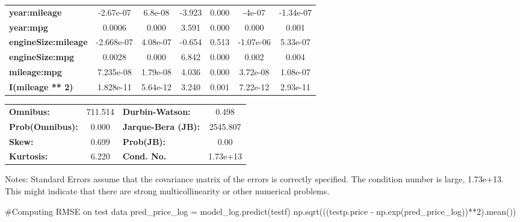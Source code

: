 \documentclass[
  letterpaper,
  DIV=11,
  numbers=noendperiod]{scrreprt}
\newenvironment{Shaded}{\begin{snugshade}}{\end{snugshade}}
\newcommand{\CommentTok}[1]{\textcolor[rgb]{0.37,0.37,0.37}{#1}}
\newcommand{\DecValTok}[1]{\textcolor[rgb]{0.68,0.00,0.00}{#1}}
\newcommand{\NormalTok}[1]{\textcolor[rgb]{0.00,0.23,0.31}{#1}}
\newcommand{\OperatorTok}[1]{\textcolor[rgb]{0.37,0.37,0.37}{#1}}
\begin{document}
\begin{center}
\begin{tabular}{lcccccc}
\textbf{year:mileage}       &    -2.67e-07  &      6.8e-08     &    -3.923  &         0.000        &       -4e-07    &    -1.34e-07     \\
\textbf{year:mpg}           &       0.0006  &        0.000     &     3.591  &         0.000        &        0.000    &        0.001     \\
\textbf{engineSize:mileage} &   -2.668e-07  &     4.08e-07     &    -0.654  &         0.513        &    -1.07e-06    &     5.33e-07     \\
\textbf{engineSize:mpg}     &       0.0028  &        0.000     &     6.842  &         0.000        &        0.002    &        0.004     \\
\textbf{mileage:mpg}        &    7.235e-08  &     1.79e-08     &     4.036  &         0.000        &     3.72e-08    &     1.08e-07     \\
\textbf{I(mileage ** 2)}    &    1.828e-11  &     5.64e-12     &     3.240  &         0.001        &     7.22e-12    &     2.93e-11     \\
\bottomrule
\end{tabular}
\begin{tabular}{lclc}
\textbf{Omnibus:}       & 711.514 & \textbf{  Durbin-Watson:     } &    0.498  \\
\textbf{Prob(Omnibus):} &   0.000 & \textbf{  Jarque-Bera (JB):  } & 2545.807  \\
\textbf{Skew:}          &   0.699 & \textbf{  Prob(JB):          } &     0.00  \\
\textbf{Kurtosis:}      &   6.220 & \textbf{  Cond. No.          } & 1.73e+13  \\
\bottomrule
\end{tabular}
\end{center}

Notes: \newline
 [1] Standard Errors assume that the covariance matrix of the errors is correctly specified. \newline
 [2] The condition number is large, 1.73e+13. This might indicate that there are \newline
 strong multicollinearity or other numerical problems.

\begin{Shaded}
\begin{Highlighting}[]
\CommentTok{\#Computing RMSE on test data}
\NormalTok{pred\_price\_log }\OperatorTok{=}\NormalTok{ model\_log.predict(testf)}
\NormalTok{np.sqrt(((testp.price }\OperatorTok{{-}}\NormalTok{ np.exp(pred\_price\_log))}\OperatorTok{**}\DecValTok{2}\NormalTok{).mean())}
\end{Highlighting}
\end{Shaded}
\end{document}
